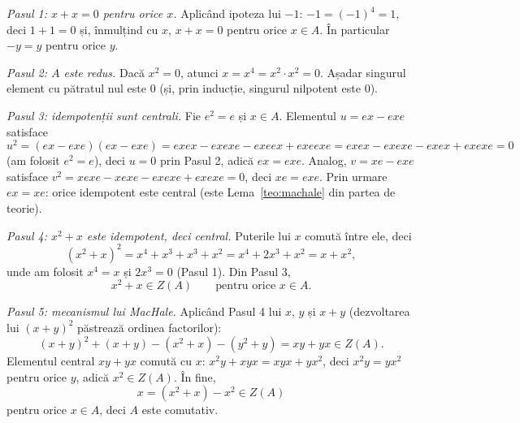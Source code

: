 \begin{solutie}
\textit{Pasul 1: $x+x=0$ pentru orice $x$.} Aplicând ipoteza lui $-1$:
$-1=(-1)^{4}=1$, deci $1+1=0$ și, înmulțind cu $x$, $x+x=0$ pentru
orice $x\in A$. În particular $-y=y$ pentru orice $y$.

\smallskip
\textit{Pasul 2: $A$ este redus.} Dacă $x^{2}=0$, atunci
$x=x^{4}=x^{2}\cdot x^{2}=0$. Așadar singurul element cu pătratul nul
este $0$ (și, prin inducție, singurul nilpotent este $0$).

\smallskip
\textit{Pasul 3: idempotenții sunt centrali.} Fie $e^{2}=e$ și
$x\in A$. Elementul $u=ex-exe$ satisface
\[
  u^{2}=(ex-exe)(ex-exe)=exex-exexe-exeex+exeexe=exex-exexe-exex+exexe=0
\]
(am folosit $e^{2}=e$), deci $u=0$ prin Pasul 2, adică $ex=exe$. Analog,
$v=xe-exe$ satisface $v^{2}=xexe-xexe-exexe+exexe=0$, deci $xe=exe$.
Prin urmare $ex=xe$: orice idempotent este central (este Lema~\ref{teo:machale}
din partea de teorie).

\smallskip
\textit{Pasul 4: $x^{2}+x$ este idempotent, deci central.} Puterile lui
$x$ comută între ele, deci
\[
  (x^{2}+x)^{2}=x^{4}+x^{3}+x^{3}+x^{2}=x^{4}+2x^{3}+x^{2}=x+x^{2},
\]
unde am folosit $x^{4}=x$ și $2x^{3}=0$ (Pasul 1). Din Pasul 3,
\[
  x^{2}+x\in Z(A)\qquad\text{pentru orice }x\in A.
\]

\smallskip
\textit{Pasul 5: mecanismul lui MacHale.} Aplicând Pasul 4 lui $x$, $y$
și $x+y$ (dezvoltarea lui $(x+y)^{2}$ păstrează ordinea factorilor):
\[
  (x+y)^{2}+(x+y)-(x^{2}+x)-(y^{2}+y)=xy+yx\in Z(A).
\]
Elementul central $xy+yx$ comută cu $x$:
$x^{2}y+xyx=xyx+yx^{2}$, deci $x^{2}y=yx^{2}$ pentru orice $y$, adică
$x^{2}\in Z(A)$. În fine,
\[
  x=(x^{2}+x)-x^{2}\in Z(A)
\]
pentru orice $x\in A$, deci $A$ este comutativ.
\end{solutie}

